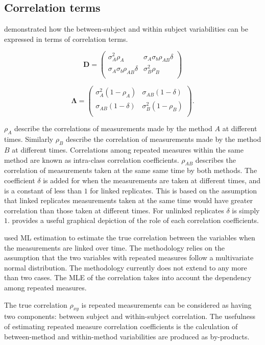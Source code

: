 \documentclass[12pt, a4paper]{report}
\theoremstyle{plain}
\theoremstyle{definition}
\theoremstyle{remark}
\begin{document}
\subsection{Correlation terms}
\citet{hamlett} demonstrated how the between-subject and within subject variabilities can be expressed in terms of
correlation terms.

\[
\boldsymbol{D} = \left( \begin{array}{cc}
\sigma^2_{A}\rho_{A} & \sigma_{A}\sigma_{b}\rho_{AB}\delta \\
\sigma_{A}\sigma_{b}\rho_{AB}\delta & \sigma^2_{B}\rho_{B}\\

\end{array}\right)
\]

\[
\boldsymbol{\Lambda} = \left(
\begin{array}{cc}
\sigma^2_{A}(1-\rho_{A}) & \sigma_{AB}(1-\delta)  \\
\sigma_{AB}(1-\delta) & \sigma^2_{B}(1-\rho_{B}) \\
\end{array}\right).
\]

$\rho_{A}$ describe the correlations of measurements made by the method $A$ at different times. Similarly $\rho_{B}$ describe the correlation of measurements made by the method $B$ at different times. Correlations among repeated measures within the same method are known as intra-class correlation coefficients. $\rho_{AB}$ describes the correlation of measurements taken at the same same time by both methods. The coefficient $\delta$ is added for when the measurements are taken at different times, and is a constant of less than $1$ for linked replicates. This is based on the assumption that linked replicates measurements taken at the same time would have greater correlation than those taken at different times. For unlinked replicates $\delta$ is simply $1$. \citet{hamlett} provides a useful graphical depiction of the role of each correlation coefficients.

\citet{Lam} used ML estimation to estimate the true correlation between the variables when the measurements are linked over time. The methodology relies on the assumption that the two variables with repeated measures follow a multivariate normal distribution. The methodology currently does not extend to any more than two cases. The MLE of the correlation takes into account the dependency among repeated measures.

The true correlation $\rho_{xy}$ is repeated measurements can be considered as having two components: between subject and within-subject correlation. The usefulness of estimating repeated measure correlation coefficients is the calculation of between-method and within-method variabilities are produced as by-products.
\end{document}
